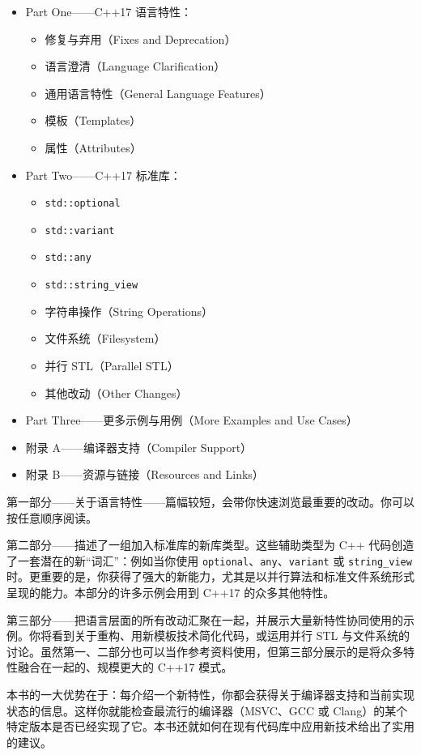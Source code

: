 \begin{itemize}
  \item Part One——C++17 语言特性：
  \begin{itemize}
    \item 修复与弃用（Fixes and Deprecation）
    \item 语言澄清（Language Clarification）
    \item 通用语言特性（General Language Features）
    \item 模板（Templates）
    \item 属性（Attributes）
  \end{itemize}
  \item Part Two——C++17 标准库：
  \begin{itemize}
    \item \texttt{std::optional}
    \item \texttt{std::variant}
    \item \texttt{std::any}
    \item \texttt{std::string\_view}
    \item 字符串操作（String Operations）
    \item 文件系统（Filesystem）
    \item 并行 STL（Parallel STL）
    \item 其他改动（Other Changes）
  \end{itemize}
  \item Part Three——更多示例与用例（More Examples and Use Cases）
  \item 附录 A——编译器支持（Compiler Support）
  \item 附录 B——资源与链接（Resources and Links）
\end{itemize}

第一部分——关于语言特性——篇幅较短，会带你快速浏览最重要的改动。你可以按任意顺序阅读。

第二部分——描述了一组加入标准库的新库类型。这些辅助类型为 C++ 代码创造了一套潜在的新“词汇”：例如当你使用 \texttt{optional}、\texttt{any}、\texttt{variant} 或 \texttt{string\_view} 时。更重要的是，你获得了强大的新能力，尤其是以并行算法和标准文件系统形式呈现的能力。本部分的许多示例会用到 C++17 的众多其他特性。

第三部分——把语言层面的所有改动汇聚在一起，并展示大量新特性协同使用的示例。你将看到关于重构、用新模板技术简化代码，或运用并行 STL 与文件系统的讨论。虽然第一、二部分也可以当作参考资料使用，但第三部分展示的是将众多特性融合在一起的、规模更大的 C++17 模式。

本书的一大优势在于：每介绍一个新特性，你都会获得关于编译器支持和当前实现状态的信息。这样你就能检查最流行的编译器（MSVC、GCC 或 Clang）的某个特定版本是否已经实现了它。本书还就如何在现有代码库中应用新技术给出了实用的建议。

